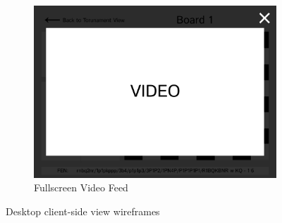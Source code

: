 \begin{figure}[h!]
    \begin{subfigure}[h!]{0.40\linewidth}
        \centering
        \includegraphics[width=\linewidth]{figures/methods/wireframes/desktop-full-screen-video-view.png}
        \caption{Fullscreen Video Feed}
        \label{fig:desktop-fullscreen-video}
    \end{subfigure}
    
    \caption{Desktop client-side view wireframes}
    \label{fig:desktop-view-group}
\end{figure}

